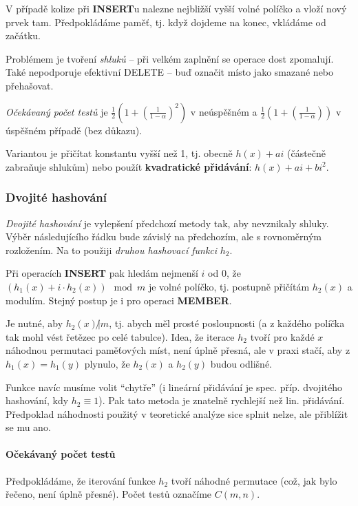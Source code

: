 \documentclass[11pt]{report} %
\numberwithin{equation}{section}
\begin{document}
V případě kolize při \textbf{INSERT}u nalezne nejbližší vyšší volné políčko a vloží nový prvek tam. Předpokládáme  paměť, tj. když dojdeme na konec, vkládáme od začátku.

Problémem je tvoření \emph{shluků} -- při velkém zaplnění se operace dost zpomalují. Také nepodporuje efektivní DELETE -- buď označit místo jako smazané nebo přehašovat. 

\emph{Očekávaný počet testů} je $\frac{1}{2}\left(1+\left(\frac{1}{1-\alpha}\right)^2\right)$ v
neúspěšném a
$\frac{1}{2}\left(1+\left(\frac{1}{1-\alpha}\right)\right)$ v
úspěšném případě (bez důkazu).

Variantou je přičítat konstantu vyšší než 1, tj. obecně $h(x) + ai$ (částečně zabraňuje shlukům) nebo použít \textbf{kvadratické přidávání}: $h(x) + ai + bi^2$.

\subsubsection{Dvojité hashování}

\emph{Dvojité hashování} je vylepšení předchozí metody tak, aby nevznikaly shluky. Výběr následujícího řádku bude závislý na předchozím, ale s rovnoměrným rozložením. Na to použiji \emph{druhou hashovací funkci} $h_2$.

Při operacích \textbf{INSERT} pak hledám nejmenší $i$ od $0$, že $(h_1(x) + i\cdot h_2(x)) \mod m$ je volné políčko, tj. postupně přičítám $h_2(x)$ a modulím. Stejný postup je i pro operaci \textbf{MEMBER}.

Je nutné, aby $h_2(x) \not | m$, tj. abych měl prosté posloupnosti (a z každého políčka tak mohl vést řetězec po celé tabulce). Idea, že iterace $h_2$ tvoří pro každé $x$ náhodnou permutaci paměťových míst, není úplně přesná, ale v praxi stačí, aby z $h_1(x) = h_1(y)$ plynulo, že $h_2(x)$ a $h_2(y)$ budou odlišné.

Funkce navíc musíme volit ``chytře'' (i lineární přidávání je spec. příp. dvojitého hashování, kdy $h_2 \equiv 1$). Pak tato metoda je znatelně rychlejší než lin. přidávání. Předpoklad náhodnosti použitý v teoretické analýze sice splnit nelze, ale přiblížit se mu ano.

\paragraph{Očekávaný počet testů}
Předpokládáme, že iterování funkce $h_2$ tvoří náhodné permutace (což, jak bylo řečeno, není úplně přesné). Počet testů označíme $C(m,n)$.
\end{document}
